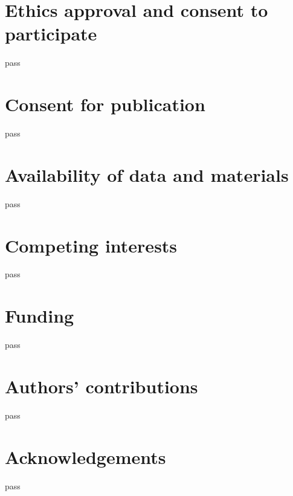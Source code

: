 \documentclass{configs/bmcart}
\begin{document}


\begin{backmatter}

\renewcommand*{\glsgroupskip}{}
\printglossary[type=\acronymtype, title=Abbreviations]

\section*{Ethics approval and consent to participate}
pass

\section*{Consent for publication}
pass

\section*{Availability of data and materials}
pass

\section*{Competing interests}
pass

\section*{Funding}
pass

\section*{Authors' contributions}
pass

\section*{Acknowledgements}
pass


\end{backmatter}
\end{document}
